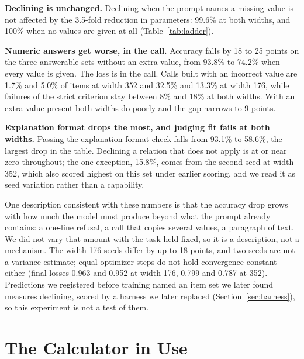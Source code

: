 \documentclass[10pt]{article}
\begin{document}
\textbf{Declining is unchanged.} Declining when the prompt names a missing value is not affected
by the 3.5-fold reduction in parameters: 99.6\% at both widths, and 100\% when no values are
given at all (Table~\ref{tab:ladder}).

\textbf{Numeric answers get worse, in the call.} Accuracy falls by 18 to 25 points on the three
answerable sets without an extra value, from 93.8\% to 74.2\% when every value is given. The loss is in the call. Calls
built with an incorrect value are 1.7\% and 5.0\% of items at width 352 and 32.5\% and 13.3\% at width
176, while failures of the strict criterion stay between 8\% and 18\% at both widths. With an
extra value present both widths do poorly and the gap narrows to 9 points.

\textbf{Explanation format drops the most, and judging fit fails at both widths.} Passing the
explanation format check falls from 93.1\% to 58.6\%, the largest drop in the table. Declining a
relation that does not apply is at or near zero throughout; the one exception, 15.8\%, comes from
the second seed at width 352, which also scored highest on this set under earlier scoring, and we
read it as seed variation rather than a capability.

One description consistent with these numbers is that the accuracy drop grows with how much the model
must produce beyond what the prompt already contains: a one-line refusal, a call that copies several
values, a paragraph of text. We did not vary that amount with the task held fixed, so it is a
description, not a mechanism. The width-176 seeds differ by up to 18 points, and two seeds are not a
variance estimate; equal optimizer steps do not hold convergence constant either (final losses 0.963
and 0.952 at width 176, 0.799 and 0.787 at 352). Predictions we registered before training named an
item set we later found measures declining, scored by a harness we later replaced
(Section~\ref{sec:harness}), so this experiment is not a test of them.

\clearpage
\makeatletter\setlength{\@fptop}{0pt}\makeatother   %
\section{The Calculator in Use}
\label{app:device}
\end{document}
